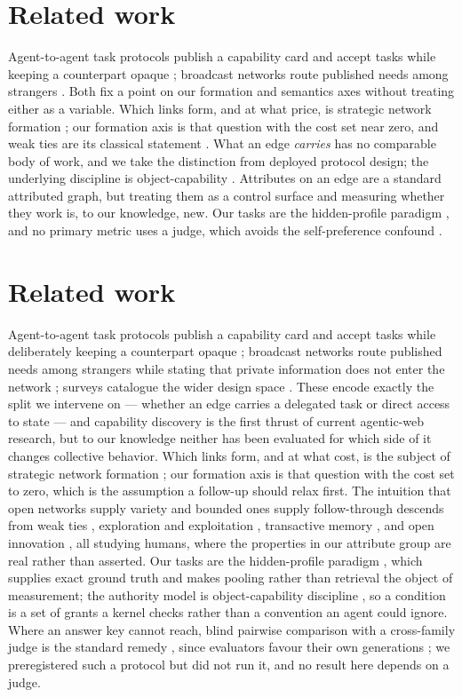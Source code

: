 \ifcompact
\section{Related work}

Agent-to-agent task protocols publish a capability card and accept tasks while keeping a
counterpart opaque \citep{a2a2025}; broadcast networks route published needs among
strangers \citep{eigenflux}. Both fix a point on our formation and semantics axes without
treating either as a variable. Which links form, and at what price, is strategic network
formation \citep{jackson1996}; our formation axis is that question with the cost set near
zero, and weak ties are its classical statement \citep{granovetter1973}. What an edge
\emph{carries} has no comparable body of work, and we take the distinction from deployed
protocol design; the underlying discipline is object-capability
\citep{miller2006}. Attributes on an edge are a standard attributed graph, but treating
them as a control surface and measuring whether they work is, to our knowledge, new. Our
tasks are the hidden-profile paradigm \citep{stasser1985}, and no primary metric uses a
judge, which avoids the self-preference confound \citep{panickssery2024}.
\else
\section{Related work}

Agent-to-agent task protocols publish a capability card and accept tasks while
deliberately keeping a counterpart opaque \citep{a2a2025}; broadcast networks route
published needs among strangers while stating that private information does not enter the
network \citep{eigenflux}; surveys catalogue the wider design space
\citep{agentprotocols2025,coral2025}. These encode exactly the split we intervene on ---
whether an edge carries a delegated task or direct access to state --- and capability
discovery is the first thrust of current agentic-web research, but to our knowledge
neither has been evaluated for which side of it changes collective behavior. Which links form, and at what
cost, is the subject of strategic network formation \citep{jackson1996}; our formation axis
is that question with the cost set to zero, which is the assumption a follow-up should
relax first. The intuition that open networks supply variety and bounded ones supply
follow-through descends from weak ties \citep{granovetter1973}, exploration and exploitation
\citep{march1991}, transactive memory \citep{wegner1987}, and open innovation
\citep{chesbrough2003}, all studying humans, where the properties in our attribute group
are real rather than asserted. Our tasks are the hidden-profile paradigm
\citep{stasser1985}, which supplies exact ground truth and makes pooling rather than
retrieval the object of measurement; the authority model is object-capability discipline
\citep{miller2006}, so a condition is a set of grants a kernel checks rather than a
convention an agent could ignore. Where an answer key cannot reach, blind pairwise
comparison with a cross-family judge is the standard remedy \citep{zheng2023}, since
evaluators favour their own generations \citep{panickssery2024}; we preregistered such a
protocol but did not run it, and no result here depends on a judge.

\fi
